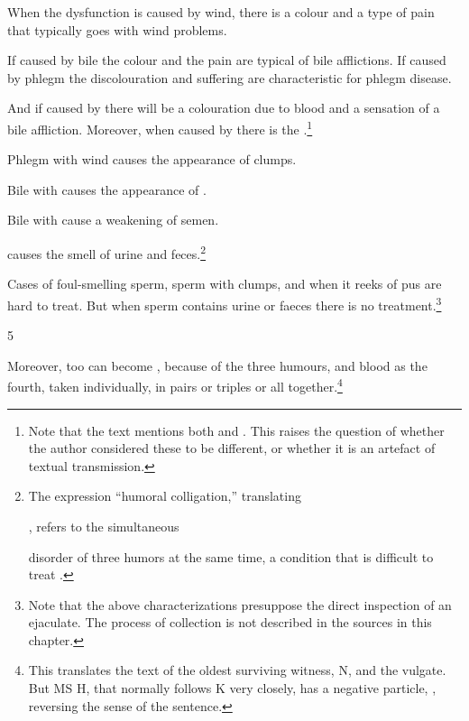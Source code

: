 \begin{translation}
 \begin{itemize}
     \item  When the dysfunction is caused by wind, there is a colour and a type 
     of pain
     that typically goes with wind problems. 
     \item If  caused by bile the colour and the 
       pain are typical of bile afflictions.  If caused by phlegm the discolouration 
       and 
        suffering are characteristic for phlegm disease.  
        \item And if caused by  
         there will be a colouration due to blood and a 
     sensation of a bile affliction. 
      Moreover, when caused by 
        there is the .\footnote{Note that the text mentions both  
     and 
     .  This raises the question of whether the author considered 
     these 
     to be different, or whether it is an artefact of textual transmission.}  \item 
     Phlegm 
            with wind causes the appearance of clumps.
         \item   Bile with   causes the appearance of 
         . 
         \item    Bile with  cause a weakening of semen.
         \item       {} causes the smell of urine 
         and 
                feces.\footnote{The expression “humoral colligation,” translating 
             \item       {}, refers to the simultaneous 
             \item       disorder of three humors at the same time, a condition that 
             is difficult to 
             treat \citep[see][38 \emph{et 
             passim}]{wuja-2016}.}             
         \end{itemize}     
Cases of foul-smelling sperm, sperm with clumps, and when it reeks of
pus are hard to treat.  But when sperm contains urine or faeces there is no
treatment.\footnote{Note that the above
    characterizations presuppose the direct inspection of an ejaculate. 
    The process of collection is not described in the sources in this
    chapter.}
 
 \item[5]
 
 Moreover,  too can become
,  because of the three
humours, and blood as the fourth, taken individually, in pairs or
triples or all together.\footnote{This translates the text of the oldest
    surviving witness, N, and the vulgate.  But MS H, that normally follows
    K very closely, has a negative particle, , reversing the sense
    of the sentence.}
 

\end{translation}
